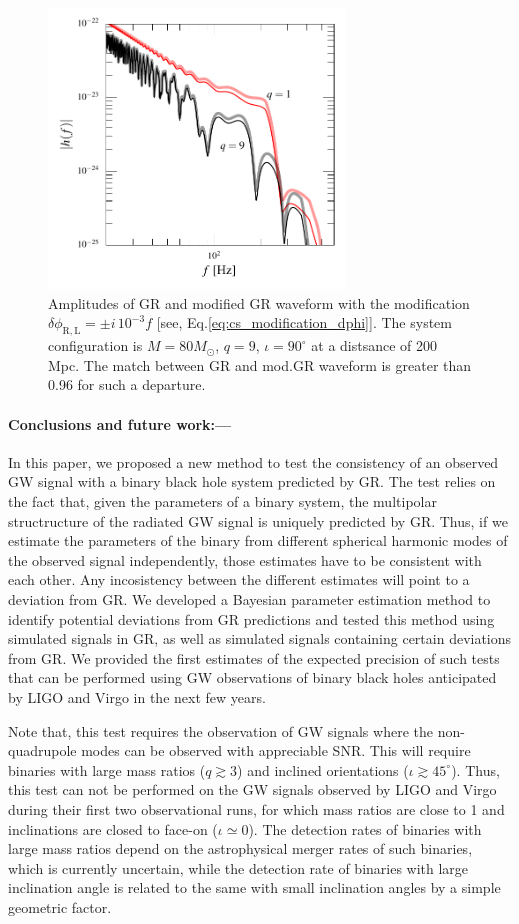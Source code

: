 \documentclass[prl,preprintnumbers,twocolumn,eqsecnum,floatfix,a4paper,nofootinbib,superscriptaddress]{revtex4}
\begin{document}
\begin{figure}[h]
	\includegraphics*[width=3.1in]{figs/mod_GR_waveform.pdf}
	\caption{Amplitudes of GR and modified GR waveform with the modification $\delta \phi_\mathrm{R,L} = \pm i \, 10^{-3} f$ [see, Eq.\eqref{eq:cs_modification_dphi}]. The system configuration is $M = 80 M_{\odot}$, $q = 9$, $\iota=90^{\circ}$ at a distsance of 200 Mpc. The match between GR and mod.GR waveform is greater than 0.96 for such a departure.}
\label{fig:mod_gr_waveform}
\end{figure}

\paragraph{Conclusions and future work:---} In this paper, we proposed a new method to test the consistency of an observed GW signal with a binary black hole system predicted by GR. The test relies on the fact that, given the parameters of a binary system, the multipolar structructure of the radiated GW signal is uniquely predicted by GR. Thus, if we estimate the parameters of the binary from different spherical harmonic modes of the observed signal independently, those estimates have to be consistent with each other. Any incosistency between the different estimates will point to a deviation from GR. We developed a Bayesian parameter estimation method to identify potential deviations from GR predictions and tested this method using simulated signals in GR, as well as simulated signals containing certain deviations from GR.  We provided the first estimates of the expected precision of such tests that can be performed using GW observations of binary black holes anticipated by LIGO and Virgo in the next few years. 

Note that, this test requires the observation of GW signals where the non-quadrupole modes can be observed with appreciable SNR. This will require binaries with large mass ratios ($q \gtrsim 3$) and inclined orientations ($\iota \gtrsim 45^{\circ}$). Thus, this test can not be performed on the GW signals observed by LIGO and Virgo during their first two observational runs, for which mass ratios are close to 1 and inclinations are closed to face-on ($\iota \simeq 0$). The detection rates of binaries with large mass ratios depend on the astrophysical merger rates of such binaries, which is currently uncertain, while the detection rate of binaries with large inclination angle is related to the same with small inclination angles by a simple geometric factor. 
\end{document}
